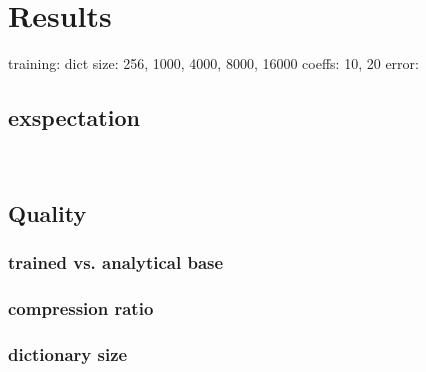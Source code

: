 \chapter{Results}
training:
dict size: 256, 1000, 4000, 8000, 16000 
coeffs: 10, 20
error:


\section{exspectation}
\
\section{Quality}
\subsection{trained vs. analytical base}
\subsection{compression ratio}
\subsection{dictionary size}




